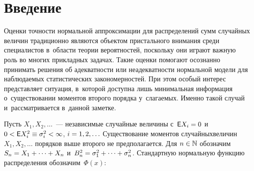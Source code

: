   
\vspace*{6pt}



\thispagestyle{headings}

\begin{multicols}{2}

\label{st\stat}

\section{Введение}

Оценки точности нормальной аппроксимации для
распределений сумм случайных величин традиционно являются объектом
пристального внимания среди специалистов в~области тео\-рии
вероятностей, поскольку они играют важную роль во многих прикладных
задачах. Такие оценки помогают осознанно принимать решения об
адекватности или неадекватности нормальной модели для наблюдаемых
статистических закономерностей. При этом особый интерес представляет
ситуация, в~которой доступна лишь минимальная информация 
о~существовании моментов второго порядка у~слагаемых. Именно такой
случай и~рассматривается в~данной заметке.

Пусть $X_1,X_2,\ldots$~--- независимые случайные величины с~${\sf E}
X_i\hm=0$ и~$0\hm<{\sf E} X_i^2\hm\equiv\sigma_i^2\hm<\infty$, $i\hm=1,2,\ldots $
Существование моментов случайных\linebreak величин $X_1,X_2,\ldots$ порядков
выше второго не предполагается. Для $n\hm\in\mathbb{N}$ обозначим
$S_n\hm=X_1+\cdots +X_n$ и~$B_n^2\hm=\sigma_1^2+\cdots +\sigma_n^2$.
Стандартную нормальную функцию распределения обозначим~$\Phi(x)$:


\end{multicols}
